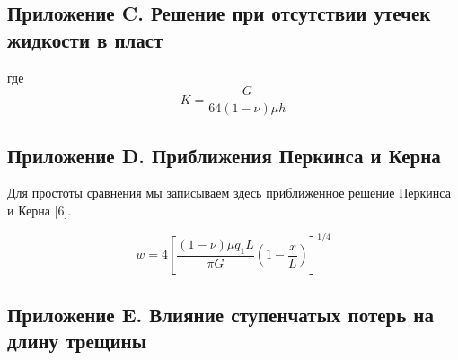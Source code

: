 \documentclass[a4paper, 11pt]{article}
\newcommand{\beq}{\begin{equation}}
\newcommand{\eeq}{\end{equation}}
\begin{document}
\subsection{Приложение C. Решение при отсутствии утечек жидкости в пласт}

где
\beq\label{C-3}
K=\frac{G}{64(1-\nu)\mu h}
\tag{C-3}
\eeq

\subsection{Приложение D. Приближения Перкинса и Керна}

Для простоты сравнения мы записываем здесь приближенное решение Перкинса и Керна [6].

\beq
w=4\left[\frac{(1-\nu)\mu q_1L}{\pi G}\left(1-\frac{x}{L}\right)\right]^{1/4}
\eeq


\subsection{Приложение E. Влияние ступенчатых потерь на длину трещины}
\end{document}
